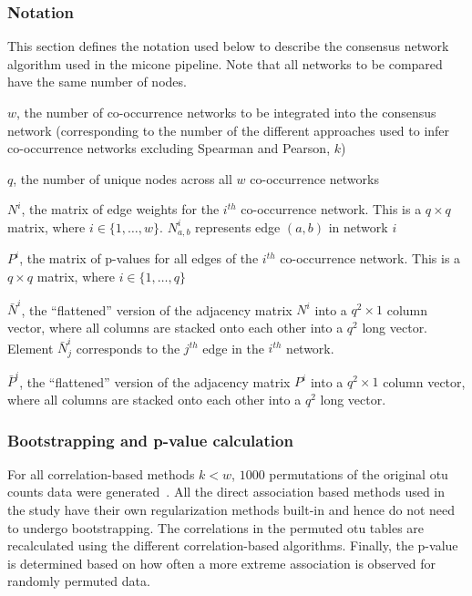  \subsubsection*{Notation}
  \vspace{-5mm}
 This section defines the notation used below to describe the consensus network algorithm used in the \ac{micone} pipeline.
 Note that all networks to be compared have the same number of nodes.

  $w$, the number of co-occurrence networks to be integrated into the consensus network (corresponding to the number of the different approaches used to infer co-occurrence networks excluding Spearman and Pearson, $k$)

  $q$, the number of unique nodes across all $w$ co-occurrence networks

  $N^i$, the matrix of edge weights for the $i^{th}$ co-occurrence network.
  This is a $q \times q$ matrix, where $i \in \{1,\dots,w\}$.
  $N^i_{a,b}$ represents edge $(a,b)$ in network $i$

  $P^i$, the matrix of p-values for all edges of the $i^{th}$ co-occurrence network.
  This is a $q \times q$ matrix, where $i \in \{1,\dots,q\}$

  $\bar{N}^i$, the ``flattened'' version of the adjacency matrix $N^i$ into a $q^2 \times 1$ column vector, where all columns are stacked onto each other into a $q^2$ long vector.
  Element $\bar{N}^i_j$ corresponds to the $j^{th}$ edge in the $i^{th}$ network.

  $\bar{P}^i$, the ``flattened'' version of the adjacency matrix $P^i$ into a $q^2 \times 1$ column vector, where all columns are stacked onto each other into a $q^2$ long vector.

  \subsubsection*{Bootstrapping and p-value calculation}
  \vspace{-5mm}
  For all correlation-based methods $k < w$, $1000$ permutations of the original \ac{otu} counts data were generated~\cite{Watts2018}.
  All the direct association based methods used in the study have their own regularization methods built-in and hence do not need to undergo bootstrapping.
  The correlations in the permuted \ac{otu} tables are recalculated using the different correlation-based algorithms.
  Finally, the p-value is determined based on how often a more extreme association is observed for randomly permuted data.

